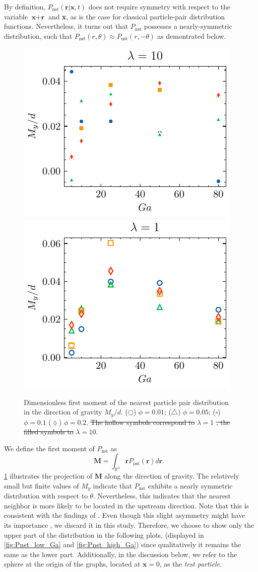 \documentclass[11pt]{My_preprint}
\providecommand{\DIFadd}[1]{{\protect\color{blue}\uwave{#1}}} %
\providecommand{\DIFdel}[1]{{\protect\color{red}\sout{#1}}}                      %
\providecommand{\DIFaddFL}[1]{\DIFadd{#1}} %
\providecommand{\DIFdelFL}[1]{\DIFdel{#1}} %
\providecommand{\DIFaddbeginFL}{} %
\providecommand{\DIFaddendFL}{} %
\providecommand{\DIFdelbeginFL}{} %
\providecommand{\DIFdelendFL}{} %
\begin{document}
By definition, $P_\text{nst}(\textbf{r}|\textbf{x},t)$ does not require symmetry with respect to the variable $\textbf{x}+\textbf{r}$ and \textbf{x}, as is the case for classical particle-pair distribution functions. 
Nevertheless, it turns out that $P_\text{nst}$ possesses a nearly-symmetric distribution, such that  $P_\text{nst}(r,\theta)\approx P_\text{nst}(r,- \theta)$ as demontrated below.
\begin{figure}[h!]
    \centering
    \DIFdelbeginFL %
\DIFdelendFL \DIFaddbeginFL \includegraphics[height = 0.3\textwidth]{image/HOMOGENEOUS_final/PA/Ry_l_10.pdf}
    \includegraphics[height = 0.3\textwidth]{image/HOMOGENEOUS_final/PA/Ry_l_1.pdf}
    \DIFaddendFL \caption{ Dimensionless first moment of the nearest particle pair distribution in the direction of gravity $M_y/d$. 
    ($\pmb\bigcirc$) $\phi = 0.01$; ($\pmb\triangle$) $ \phi = 0.05$; ($\pmb\square$) $\phi = 0.1$ ($\pmb\lozenge$) $\phi = 0.2$.
    \DIFdelbeginFL \DIFdelFL{The hollow symbols correspond to }\DIFdelendFL \DIFaddbeginFL \DIFaddFL{(right)  }\DIFaddendFL $\lambda  = 1$
    \DIFdelbeginFL \DIFdelFL{, the filled symbols to }\DIFdelendFL \DIFaddbeginFL \DIFaddFL{(left)  }\DIFaddendFL $\lambda  = 10$.
}
    \label{fig:ap:RY}
\end{figure}
We define the first moment of $P_\text{nst}$ as
\begin{equation}
 \textbf{M} = \int_{\mathbb{R}^3} \textbf{r} P_\text{nst}(\textbf{r}) d\textbf{r}.
\end{equation}
\ref{fig:ap:RY} illustrates the projection of $\textbf{M}$ along the direction of gravity. 
The relatively small but finite values of $M_y$ indicate that $P_\text{nst}$ exhibits a nearly symmetric distribution with respect to $\theta$.
Nevertheless, this indicates that the nearest neighbor is more likely to be located in the upstream direction. 
Note that this is consistent with the findings of \citet{zhang2023evolution}.
Even though this slight asymmetry might have its importance \cite{zhang2023evolution}, we discard it in this study. 
Therefore, we choose to show only the upper part of the distribution in the following plots, (displayed in \ref{fig:Pnst_low_Ga} and \ref{fig:Pnst_high_Ga}) since qualitatively it remains the same as the lower part.  
Additionally, in the discussion below, we refer to the sphere at the origin of the graphs, located at $\textbf{x}=0$, as the \textit{test particle}.
\end{document}
